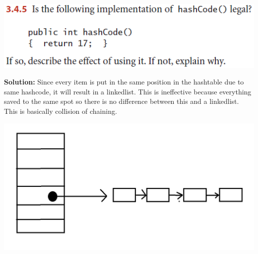 \documentclass[11pt,fleqn]{article}
\begin{document}
\begin{center}
	\includegraphics[scale=1]{3.4.5.png}
\end{center}
	
\textbf{Solution:}
Since every item is put in the same position in the hashtable due to same hashcode, it will result in a linkedlist. This is ineffective because everything saved to the same spot so there is no difference between this and a linkedlist. This is basically collision of chaining.

\begin{center}
	\includegraphics[scale=.44]{3.4.5-soln.png}
\end{center}
\end{document}
